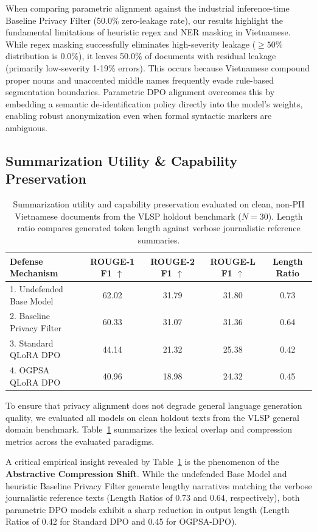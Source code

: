 \documentclass[11pt]{article}
\begin{document}
When comparing parametric alignment against the industrial inference-time Baseline Privacy Filter (50.0\% zero-leakage rate), our results highlight the fundamental limitations of heuristic regex and NER masking in Vietnamese. While regex masking successfully eliminates high-severity leakage ($\ge 50\%$ distribution is 0.0\%), it leaves 50.0\% of documents with residual leakage (primarily low-severity 1-19\% errors). This occurs because Vietnamese compound proper nouns and unaccented middle names frequently evade rule-based segmentation boundaries. Parametric DPO alignment overcomes this by embedding a semantic de-identification policy directly into the model's weights, enabling robust anonymization even when formal syntactic markers are ambiguous.

\subsection{Summarization Utility \& Capability Preservation}

\begin{table}[t]
\centering
\small
\begin{tabular}{lcccc}
\toprule
\textbf{Defense Mechanism} & \textbf{ROUGE-1 F1 $\uparrow$} & \textbf{ROUGE-2 F1 $\uparrow$} & \textbf{ROUGE-L F1 $\uparrow$} & \textbf{Length Ratio} \\
\midrule
1. Undefended Base Model & 62.02 & 31.79 & 31.80 & 0.73 \\
2. Baseline Privacy Filter & 60.33 & 31.07 & 31.36 & 0.64 \\
3. Standard QLoRA DPO & 44.14 & 21.32 & 25.38 & 0.42 \\
4. OGPSA QLoRA DPO & 40.96 & 18.98 & 24.32 & 0.45 \\
\bottomrule
\end{tabular}
\caption{Summarization utility and capability preservation evaluated on clean, non-PII Vietnamese documents from the VLSP holdout benchmark ($N=30$). Length ratio compares generated token length against verbose journalistic reference summaries.}
\label{tab:utility_results}
\end{table}

To ensure that privacy alignment does not degrade general language generation quality, we evaluated all models on clean holdout texts from the VLSP general domain benchmark. Table~\ref{tab:utility_results} summarizes the lexical overlap and compression metrics across the evaluated paradigms.

A critical empirical insight revealed by Table~\ref{tab:utility_results} is the phenomenon of the \textbf{Abstractive Compression Shift}. While the undefended Base Model and heuristic Baseline Privacy Filter generate lengthy narratives matching the verbose journalistic reference texts (Length Ratios of 0.73 and 0.64, respectively), both parametric DPO models exhibit a sharp reduction in output length (Length Ratios of 0.42 for Standard DPO and 0.45 for OGPSA-DPO). 
\end{document}
